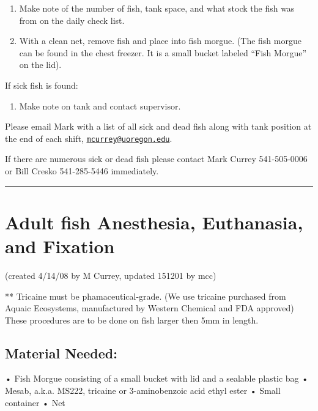 \documentclass[
]{book}
\providecommand{\tightlist}{%
  \setlength{\itemsep}{0pt}\setlength{\parskip}{0pt}}
\begin{document}
\begin{enumerate}
\def\labelenumi{\arabic{enumi}.}
\tightlist
\item
  Make note of the number of fish, tank space, and what stock the fish was from on the daily check list.
\item
  With a clean net, remove fish and place into fish morgue. (The fish morgue can be found in the chest freezer. It is a small bucket labeled ``Fish Morgue'' on the lid).
\end{enumerate}

If sick fish is found:

\begin{enumerate}
\def\labelenumi{\arabic{enumi}.}
\tightlist
\item
  Make note on tank and contact supervisor.
\end{enumerate}

Please email Mark with a list of all sick and dead fish along with tank position at the end of each shift, \href{mailto:mcurrey@uoregon.edu}{\nolinkurl{mcurrey@uoregon.edu}}.

If there are numerous sick or dead fish please contact Mark Currey 541-505-0006 or Bill Cresko 541-285-5446 immediately.

\begin{center}\rule{0.5\linewidth}{0.5pt}\end{center}

\hypertarget{adult-fish-anesthesia-euthanasia-and-fixation}{%
\section{Adult fish Anesthesia, Euthanasia, and Fixation}\label{adult-fish-anesthesia-euthanasia-and-fixation}}

(created 4/14/08 by M Currey, updated 151201 by mcc)

** Tricaine must be phamaceutical-grade. (We use tricaine purchased from Aquaic Ecosystems, manufactured by Western Chemical and FDA approved)
These procedures are to be done on fish larger then 5mm in length.

\hypertarget{material-needed}{%
\subsection{Material Needed:}\label{material-needed}}

• Fish Morgue consisting of a small bucket with lid and a sealable plastic bag
• Mesab, a.k.a. MS222, tricaine or 3-aminobenzoic acid ethyl ester
• Small container
• Net
\end{document}
